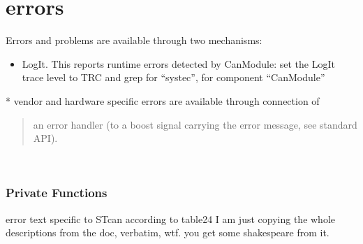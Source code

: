 \documentclass[a4paper,10pt,english]{sphinxmanual}
\begin{document}
\section{errors}
\label{\detokenize{vendors/systec:errors}}
Errors and problems are available through two mechanisms:
\begin{itemize}
\item {} 
LogIt. This reports runtime errors detected by CanModule:
set the LogIt trace level to TRC and grep for “systec”, for component “CanModule”

\end{itemize}

* vendor and hardware specific errors are available through connection of
\begin{quote}

an error handler (to a boost signal carrying the error message, see standard API).
\end{quote}

\begin{fulllineitems}
\label{\detokenize{vendors/systec:_CPPv49STCanScan}}%
\pysigstartmultiline
{}%
\pysigstopmultiline~\subsubsection*{Private Functions}

\begin{fulllineitems}
\label{\detokenize{vendors/systec:_CPPv4N9STCanScan17STcanGetErrorTextEl}}%
\pysigstartmultiline
{}%
\pysigstopmultiline
error text specific to STcan according to table24 I am just copying the whole descriptions from the doc, verbatim, wtf. you get some shakespeare from it. 

\end{fulllineitems}


\end{fulllineitems}
\end{document}
